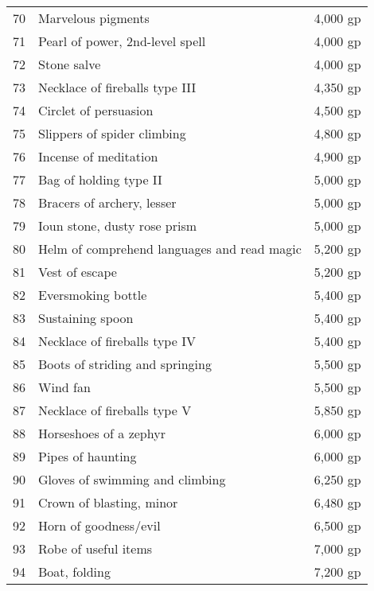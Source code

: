 \begin{table}[]
\begin{tabular}{lll}
70  & Marvelous pigments                          & 4,000 gp     \\
71  & Pearl of power, 2nd-level spell             & 4,000 gp     \\
72  & Stone salve                                 & 4,000 gp     \\
73  & Necklace of fireballs type III              & 4,350 gp     \\
74  & Circlet of persuasion                       & 4,500 gp     \\
75  & Slippers of spider climbing                 & 4,800 gp     \\
76  & Incense of meditation                       & 4,900 gp     \\
77  & Bag of holding type II                      & 5,000 gp     \\
78  & Bracers of archery, lesser                  & 5,000 gp     \\
79  & Ioun stone, dusty rose prism                & 5,000 gp     \\
80  & Helm of comprehend languages and read magic & 5,200 gp     \\
81  & Vest of escape                              & 5,200 gp     \\
82  & Eversmoking bottle                          & 5,400 gp     \\
83  & Sustaining spoon                            & 5,400 gp     \\
84  & Necklace of fireballs type IV               & 5,400 gp     \\
85  & Boots of striding and springing             & 5,500 gp     \\
86  & Wind fan                                    & 5,500 gp     \\
87  & Necklace of fireballs type V                & 5,850 gp     \\
88  & Horseshoes of a zephyr                      & 6,000 gp     \\
89  & Pipes of haunting                           & 6,000 gp     \\
90  & Gloves of swimming and climbing             & 6,250 gp     \\
91  & Crown of blasting, minor                    & 6,480 gp     \\
92  & Horn of goodness/evil                       & 6,500 gp     \\
93  & Robe of useful items                        & 7,000 gp     \\
94  & Boat, folding                               & 7,200 gp     \\

\end{tabular}
\end{table}
